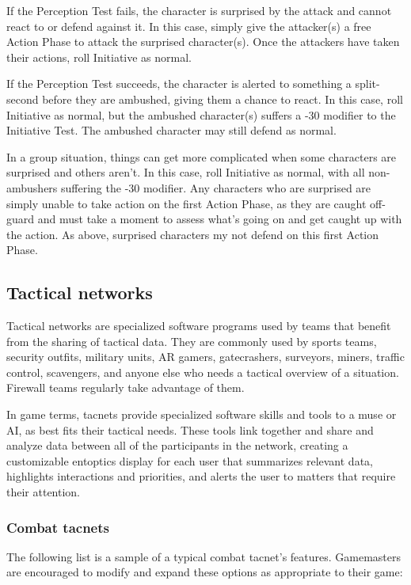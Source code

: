 If the Perception Test fails, the character is surprised by the attack and cannot react to or defend against it. In this case, simply give the attacker(s) a free Action Phase to attack the surprised character(s). Once the attackers have taken their actions, roll Initiative as normal.

If the Perception Test succeeds, the character is alerted to something a split-second before they are ambushed, giving them a chance to react. In this case, roll Initiative as normal, but the ambushed character(s) suffers a -30 modifier to the Initiative Test. The ambushed character may still defend as normal.

In a group situation, things can get more complicated when some characters are surprised and others aren’t. In this case, roll Initiative as normal, with all non-ambushers suffering the -30 modifier. Any characters who are surprised are simply unable to take action on the first Action Phase, as they are caught off-guard and must take a moment to assess what’s going on and get caught up with the action. As above, surprised characters my not defend on this first Action Phase.


\subsection{Tactical networks}
\label{sec:tactical-networks}

Tactical networks are specialized software programs used by teams that benefit from the sharing of tactical data. They are commonly used by sports teams, security outfits, military units, AR gamers, gatecrashers, surveyors, miners, traffic control, scavengers, and anyone else who needs a tactical overview of a situation. Firewall teams regularly take advantage of them.

In game terms, tacnets provide specialized software skills and tools to a muse or AI, as best fits their tactical needs. These tools link together and share and analyze data between all of the participants in the network, creating a customizable entoptics display for each user that summarizes relevant data, highlights interactions and priorities, and alerts the user to matters that require their attention.

\subsubsection{Combat tacnets} The following list is a sample of a typical combat tacnet’s features. Gamemasters are encouraged to modify and expand these options as appropriate to their game:

